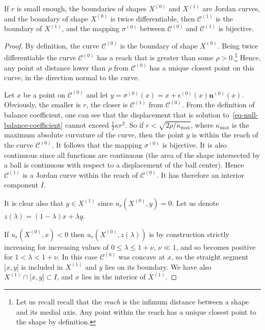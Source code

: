 \documentclass{siamart220329}
\newcommand{\C}{\mathcal{C}} %
\begin{document}
\begin{proposition} \label{prop-C-equ-X}
  If $r$ is small enough, the boundaries of shapes $X^{(0)}$ and
  $X^{(1)}$ are Jordan curves, and the boundary of shape $X^{(0)}$ is
  twice differentiable, then $\C^{(1)}$ is the boundary of $X^{(1)}$,
  and the mapping $\sigma^{(0)}$ between $\C^{(0)}$ and $\C^{(1)}$ is
  bijective.
\end{proposition}
\begin{proof}
  By definition, the curve $\C^{(0)}$ is the boundary of shape
  $X^{(0)}$.  Being twice differentiable the curve $\C^{(0)}$ has a
  reach that is greater than some $\rho > 0$.\footnote{Let us recall
  recall that the {\em reach} is the infimum distance between a shape
  and its medial axis. Any point within the reach has a unique closest
  point to the shape by definition.} Hence, any point at distance lower than $\rho$
  from $\C^{(0)}$ has a unique closest point on this curve, in the
  direction normal to the curve.

  Let $x$ be a point on $\C^{(0)}$ and let
  $y=\sigma^{(0)}(x)=x+\epsilon^{(0)}(x) \mathbf{n}^{(0)}(x)$.
  Obviously, the smaller is $r$, the closer is $\C^{(1)}$ from
  $\C^{(0)}$.  From the definition of balance coefficient, one can see
  that the displacement that is solution to~\cref{eq-null-balance-coefficient} cannot exceed $\frac{1}{2}\kappa
  r^2$. So if $r < \sqrt{2\rho / \kappa_{\max}}$, where
  $\kappa_{\max}$ is the maximum absolute curvature of the curve, then
  the point $y$ is within the reach of the curve $\C^{(0)}$. It follows
  that the mapping $\sigma^{(0)}$ is bijective. It is also continuous
  since all functions are continuous (the area of the shape
  intersected by a ball is continuous with respect to a displacement
  of the ball center).  Hence $\C^{(1)}$ is a Jordan curve within the
  reach of $\C^{(0)}$. It has therefore an interior component $I$.

  It is clear also that $y \in X^{(1)}$ since $u_r(X^{(0)},y)=0$.
  Let us denote $z(\lambda)=(1-\lambda)x+\lambda y$.

  If $u_r(X^{(0)},x)<0$ then $u_r(X^{(0)},z(\lambda))$ is by
  construction strictly increasing for increasing values of $0 \le
  \lambda \le 1+\nu$, $\nu \ll 1$, and so becomes positive for
  $1<\lambda < 1 + \nu$. In this case $\C^{(0)}$ was concave at $x$,
  so the straight segment $\lbrack x,y \rbrack$ is included in
  $X^{(1)}$ and $y$ lies on its boundary. We have also $X^{(1)}
  \cap \lbrack x,y \rbrack \subset I$, and $x$ lies in the interior of
  $X^{(1)}$.
  

\end{proof}
\end{document}

